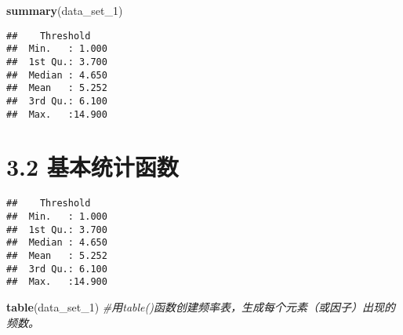 \documentclass[
]{book}
\newenvironment{Shaded}{\begin{snugshade}}{\end{snugshade}}
\newcommand{\CommentTok}[1]{\textcolor[rgb]{0.56,0.35,0.01}{\textit{#1}}}
\newcommand{\FunctionTok}[1]{\textcolor[rgb]{0.13,0.29,0.53}{\textbf{#1}}}
\newcommand{\NormalTok}[1]{#1}
\theoremstyle{definition}
\theoremstyle{definition}
\theoremstyle{definition}
\theoremstyle{definition}
\theoremstyle{remark}
\begin{document}
\begin{Shaded}
\begin{Highlighting}[]
\FunctionTok{summary}\NormalTok{(data\_set\_1)}
\end{Highlighting}
\end{Shaded}

\begin{verbatim}
##    Threshold     
##  Min.   : 1.000  
##  1st Qu.: 3.700  
##  Median : 4.650  
##  Mean   : 5.252  
##  3rd Qu.: 6.100  
##  Max.   :14.900
\end{verbatim}

\hypertarget{ux57faux672cux7edfux8ba1ux51fdux6570}{%
\section*{3.2 基本统计函数}\label{ux57faux672cux7edfux8ba1ux51fdux6570}}

\begin{Shaded}
\end{Shaded}

\begin{verbatim}
##    Threshold     
##  Min.   : 1.000  
##  1st Qu.: 3.700  
##  Median : 4.650  
##  Mean   : 5.252  
##  3rd Qu.: 6.100  
##  Max.   :14.900
\end{verbatim}

\begin{Shaded}
\begin{Highlighting}[]
\FunctionTok{table}\NormalTok{(data\_set\_1) }\CommentTok{\#用table()函数创建频率表，生成每个元素（或因子）出现的频数。}
\end{Highlighting}
\end{Shaded}
\end{document}
